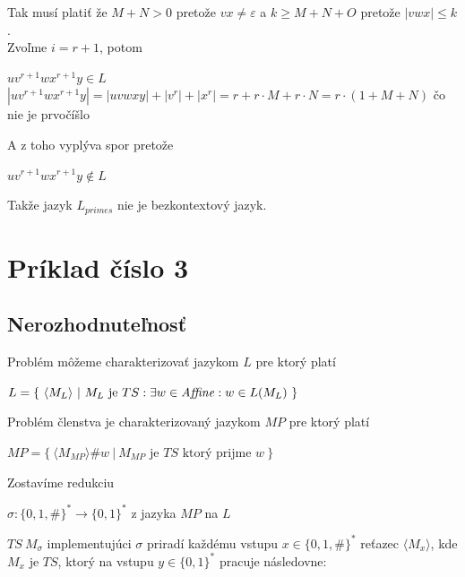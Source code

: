 \documentclass[11pt,a4paper]{article}
\begin{document}
Tak musí platiť že $M+N > 0$ pretože $vx \neq \varepsilon$ a $k \geq M+N+O$ pretože $|vwx| \leq k$.\\

Zvoľme $i=r+1$, potom

\begin{center}
$uv^{r+1}wx^{r+1}y \in L$\\[0.5em]
$|uv^{r+1}wx^{r+1}y| = |uvwxy| + |v^{r}| + |x^{r}| = r + r \cdot M + r \cdot N = r \cdot (1+M+N)$ čo nie je prvočíšlo\\
\end{center}

A z toho vyplýva spor pretože

\begin{center}
$uv^{r+1}wx^{r+1}y \notin L$
\end{center}

Takže jazyk $L_{primes}$ nie je bezkontextový jazyk.

\newpage
\section{Príklad číslo 3} %

\subsection{Nerozhodnuteľnosť}

Problém môžeme charakterizovať jazykom $L$ pre ktorý platí

\begin{center}
    $L = \{ \ \langle M_{L} \rangle \ | \ M_{L} \text{ je } TS: \exists w \in \text{\textit{Affine}}: w \in L(M_{L}) \ \}$
\end{center}

Problém členstva je charakterizovaný jazykom $MP$ pre ktorý platí

\begin{center}
    $MP = \{ \ \langle M_{MP} \rangle \# w  \ | \ M_{MP} \text{ je } TS \text{ ktorý prijme } w \ \}$
\end{center}

Zostavíme redukciu

\begin{center}
    $\sigma: \{0,1,\#\}^{*} \longrightarrow \{0,1\}^{*}$ z jazyka $MP$ na $L$
\end{center}

$TS \ M_{\sigma}$ implementujúci $\sigma$ priradí každému vstupu $x \in \{0,1,\#\}^{*}$ reťazec $\langle M_{x} \rangle$, kde $M_{x}$ je $TS$, ktorý na vstupu $y \in \{0,1\}^{*}$ pracuje následovne:
\end{document}
